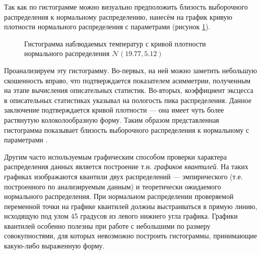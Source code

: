Так как по гистограмме можно визуально предположить близость выборочного распределения к нормальному распределению, нанесём на график кривую плотности нормального распределения с параметрами \normaldistr (рисунок \ref{img:histogram_fitted}).
\begin{figure}[ht]
\caption{Гистограмма наблюдаемых температур с кривой плотности нормального распределения $\mathcal{N}(19.77, 5.12)$}
\label{img:histogram_fitted}
\end{figure}
Проанализируем эту гистограмму. Во-первых, на ней можно заметить небольшую скошенность вправо, что подтверждается показателем асимметрии, полученным на этапе вычисления описательных статистик. Во-вторых, коэффициент эксцесса в описательных статистиках указывал на пологость пика распределения. Данное заключение подтверждается кривой плотности --- она имеет чуть более растянутую колоколообразную форму. Таким образом представленная гистограмма показывает близость выборочного распределения к нормальному с параметрами \normaldistr.

Другим часто используемым графическим способом проверки характера распределения данных является построение т.н. \textit{графиков квантилей}. На таких графиках изображаются квантили двух распределений --- эмпирического (т.е. построенного по анализируемым данным) и теоретически ожидаемого нормального распределения. При нормальном распределении проверяемой переменной точки на графике квантилей должны выстраиваться в прямую линию, исходящую под улом 45 градусов из левого нижнего угла графика. Графики квантилей особенно полезны при работе с небольшими по размеру совокупностями, для которых невозможно построить гистограммы, принимающие какую-либо выраженную форму.


